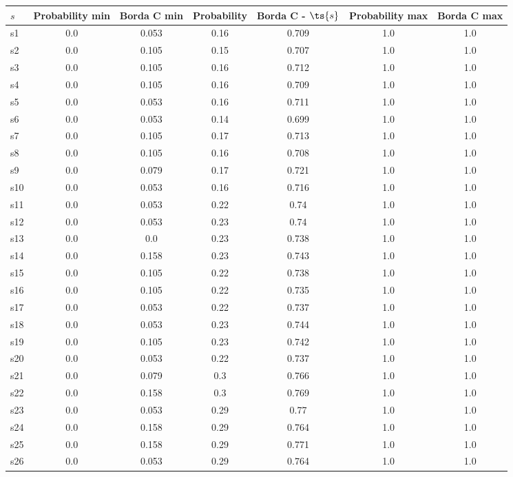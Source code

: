 \documentclass{article}
\begin{document}
\noindent\begin{tabular}{|l|c|c|c|c|c|c|}
\hline
$s$& Probability min & Borda C min & Probability & Borda C - $\ts{s}$ & Probability max & Borda C max\\
\hline
s1 &0.0 & 0.053 & 0.16 & 0.709 & 1.0 & 1.0\\
\hline
s2 &0.0 & 0.105 & 0.15 & 0.707 & 1.0 & 1.0\\
\hline
s3 &0.0 & 0.105 & 0.16 & 0.712 & 1.0 & 1.0\\
\hline
s4 &0.0 & 0.105 & 0.16 & 0.709 & 1.0 & 1.0\\
\hline
s5 &0.0 & 0.053 & 0.16 & 0.711 & 1.0 & 1.0\\
\hline
s6 &0.0 & 0.053 & 0.14 & 0.699 & 1.0 & 1.0\\
\hline
s7 &0.0 & 0.105 & 0.17 & 0.713 & 1.0 & 1.0\\
\hline
s8 &0.0 & 0.105 & 0.16 & 0.708 & 1.0 & 1.0\\
\hline
s9 &0.0 & 0.079 & 0.17 & 0.721 & 1.0 & 1.0\\
\hline
s10 &0.0 & 0.053 & 0.16 & 0.716 & 1.0 & 1.0\\
\hline
s11 &0.0 & 0.053 & 0.22 & 0.74 & 1.0 & 1.0\\
\hline
s12 &0.0 & 0.053 & 0.23 & 0.74 & 1.0 & 1.0\\
\hline
s13 &0.0 & 0.0 & 0.23 & 0.738 & 1.0 & 1.0\\
\hline
s14 &0.0 & 0.158 & 0.23 & 0.743 & 1.0 & 1.0\\
\hline
s15 &0.0 & 0.105 & 0.22 & 0.738 & 1.0 & 1.0\\
\hline
s16 &0.0 & 0.105 & 0.22 & 0.735 & 1.0 & 1.0\\
\hline
s17 &0.0 & 0.053 & 0.22 & 0.737 & 1.0 & 1.0\\
\hline
s18 &0.0 & 0.053 & 0.23 & 0.744 & 1.0 & 1.0\\
\hline
s19 &0.0 & 0.105 & 0.23 & 0.742 & 1.0 & 1.0\\
\hline
s20 &0.0 & 0.053 & 0.22 & 0.737 & 1.0 & 1.0\\
\hline
s21 &0.0 & 0.079 & 0.3 & 0.766 & 1.0 & 1.0\\
\hline
s22 &0.0 & 0.158 & 0.3 & 0.769 & 1.0 & 1.0\\
\hline
s23 &0.0 & 0.053 & 0.29 & 0.77 & 1.0 & 1.0\\
\hline
s24 &0.0 & 0.158 & 0.29 & 0.764 & 1.0 & 1.0\\
\hline
s25 &0.0 & 0.158 & 0.29 & 0.771 & 1.0 & 1.0\\
\hline
s26 &0.0 & 0.053 & 0.29 & 0.764 & 1.0 & 1.0\\

\end{tabular}
\end{document}
